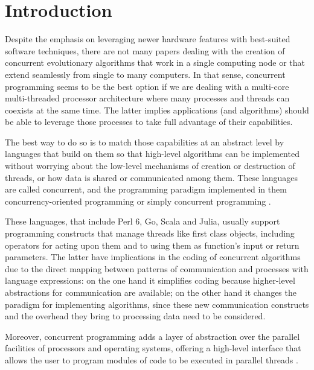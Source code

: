 \documentclass[runningheads]{llncs}\usepackage[]{graphicx}\usepackage[]{color}
\begin{document}

\section{Introduction}

Despite the emphasis on leveraging newer hardware features
with best-suited software techniques,
 there are not many papers \cite{Xia2010} dealing with the 
creation of concurrent evolutionary algorithms that work in a single
computing node or that extend seamlessly from single to many
computers. In that sense, concurrent programming seems to be the best 
option if we are dealing with a multi-core multi-threaded processor architecture 
where many processes and threads can coexists at the same time. The latter 
implies applications (and algorithms) should be able to leverage those
processes to take full advantage of their capabilities.

The best way to do so is
to match those capabilities at an abstract level by languages
that build on them so that high-level algorithms can be implemented without
worrying about the low-level mechanisms of creation or destruction of
threads, or how data is shared or communicated among them. These
languages are called concurrent, and the programming paradigm
implemented in them concurrency-oriented programming or simply
concurrent programming \cite{Armstrong2003}.

These languages, that include Perl 6, Go, Scala and Julia, usually support 
programming constructs that manage threads like first class
objects, including operators for acting upon them and to using them as 
function's input or return parameters. The latter have implications in 
the coding of concurrent algorithms due to the
direct mapping between patterns of communication and processes with
language expressions: on the one hand it simplifies coding because higher-level
abstractions for communication are available; on the other hand
it changes the paradigm for implementing algorithms, since these new
communication constructs and the overhead they bring to processing
data need to be considered.

Moreover, concurrent programming adds a layer of abstraction over the parallel
facilities of processors and operating systems, offering a
high-level interface that allows the user to program modules of code to
be executed in parallel threads \cite{andrews1991concurrent}.
\end{document}

